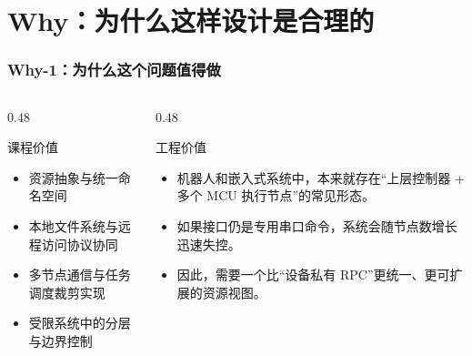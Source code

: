 \documentclass[aspectratio=169]{ctexbeamer}
\begin{document}
\section{Why：为什么这样设计是合理的}

\begin{frame}
  \frametitle{Why-1：为什么这个问题值得做}
  \begin{columns}[T]
    \begin{column}{0.48\textwidth}
      \begin{block}{课程价值}
        \small
        \begin{itemize}
          \item 资源抽象与统一命名空间
          \item 本地文件系统与远程访问协议协同
          \item 多节点通信与任务调度裁剪实现
          \item 受限系统中的分层与边界控制
        \end{itemize}
      \end{block}
    \end{column}
    \begin{column}{0.48\textwidth}
      \begin{block}{工程价值}
        \small
        \begin{itemize}
          \item 机器人和嵌入式系统中，本来就存在“上层控制器 + 多个 MCU 执行节点”的常见形态。
          \item 如果接口仍是专用串口命令，系统会随节点数增长迅速失控。
          \item 因此，需要一个比“设备私有 RPC”更统一、更可扩展的资源视图。
        \end{itemize}
      \end{block}
    \end{column}
  \end{columns}
\end{frame}
\end{document}
